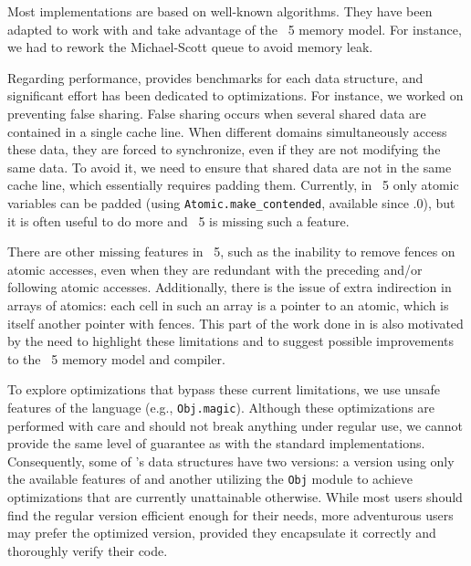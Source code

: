 \documentclass[a4paper, 11pt]{article}
\begin{document}
Most implementations are based on well-known algorithms.
They have been adapted to work with and take advantage of the \OCaml~5 memory model.
For instance, we had to rework the Michael-Scott queue to avoid memory leak.

Regarding performance, \Saturn provides benchmarks for each data structure, and significant effort has been dedicated to optimizations.
For instance, we worked on preventing false sharing. False sharing occurs when several shared data are contained in a single cache line. 
When different domains simultaneously access these data, they are forced to synchronize, even if they are not modifying the same data.
To avoid it, we need to ensure that shared data are not in the same cache line, which essentially requires padding them.
Currently, in \OCaml~5 only atomic variables can be padded (using \texttt{Atomic.make\_contended}, available since .0), but it is often useful to do more and \OCaml~5 is missing such a feature.



There are other missing features in \OCaml~5, such as the inability to remove fences on atomic accesses, even when they are redundant with the preceding and/or following atomic accesses.
Additionally, there is the issue of extra indirection in arrays of atomics: each cell in such an array is a pointer to an atomic, which is itself another pointer with fences. This part of the work done in \Saturn is also motivated by the need to highlight these limitations and to suggest possible improvements to the \OCaml~5 memory model and compiler.


To explore optimizations that bypass these current limitations, we use unsafe features of the language (e.g., \texttt{Obj.magic}). Although these optimizations are performed with care and should not break anything under regular use, we cannot provide the same level of guarantee as with the standard implementations. Consequently, some of \Saturn's data structures have two versions: a version using only the available features of \OCaml and another utilizing the \texttt{Obj} module to achieve optimizations that are currently unattainable otherwise. While most users should find the regular version efficient enough for their needs, more adventurous users may prefer the optimized version, provided they encapsulate it correctly and thoroughly verify their code.
\end{document}

